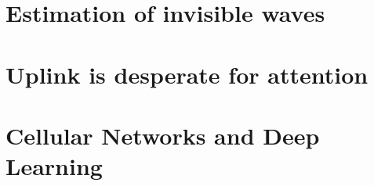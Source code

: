 \documentclass[nobib, b5paper]{tufte-book}
\begin{document}
\part{Estimation of invisible waves}





\part{Uplink is desperate for attention}




\part{Cellular Networks and Deep Learning}







\appendix












\backmatter



%
{\footnotesize
\printbibliography}


\end{document}
